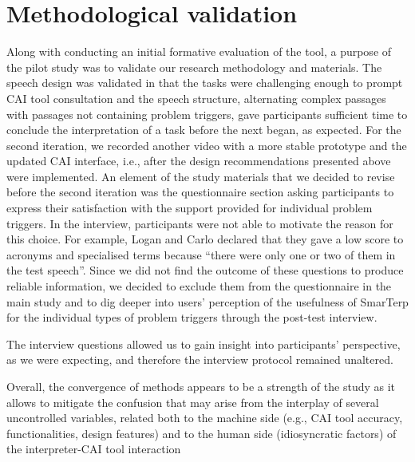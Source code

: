 \section{Methodological validation}

Along with conducting an initial formative evaluation of the tool, a  purpose of the pilot study was to validate our research methodology and materials. The speech design was validated in that the tasks were challenging enough to prompt CAI tool consultation and the speech structure, alternating complex passages with passages not containing problem triggers, gave participants sufficient time to conclude the interpretation of a task before the next began, as expected. For the second iteration, we recorded another video with a more stable prototype and the updated CAI interface, i.e., after the design recommendations presented above were implemented.
An element of the study materials that we decided to revise before the second iteration was the  questionnaire section asking participants to express their satisfaction with the support provided for individual problem triggers. In the interview, participants were not able to motivate the reason for this choice. For example, Logan and Carlo declared that they gave a low score to acronyms and specialised terms because ``there were only one or two of them in the test speech''. Since we did not find the outcome of these questions to produce reliable information, we decided to exclude them from the questionnaire in the main study and to dig deeper into users’ perception of the usefulness of SmarTerp for the individual types of problem triggers through the post-test interview.

The interview questions allowed us to gain insight into participants’ perspective, as we were expecting, and therefore the interview protocol remained unaltered.

Overall, the convergence of methods appears to be a strength of the study as it allows to mitigate the confusion that may arise from the interplay of several uncontrolled variables, related both to the machine side (e.g., CAI tool accuracy, functionalities, design features) and to the human side (idiosyncratic factors) of the interpreter-CAI tool interaction
